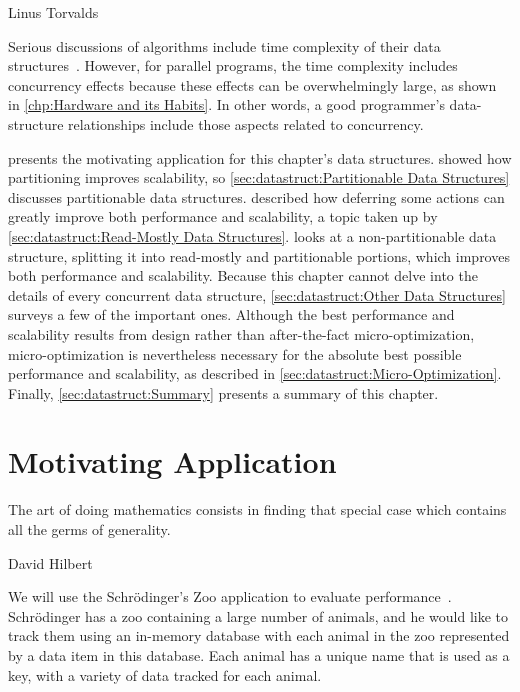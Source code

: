 
%
	 {Linus Torvalds}

Serious discussions of algorithms include time complexity of their
data structures~\cite{ThomasHCorman2001Algorithms}.
However, for parallel programs, the time complexity includes concurrency
effects because these effects can be overwhelmingly large, as shown in
\cref{chp:Hardware and its Habits}.
In other words, a good programmer's data-structure relationships
include those aspects related to concurrency.

presents the motivating application for this chapter's data structures.
 showed how
partitioning improves scalability, so
\cref{sec:datastruct:Partitionable Data Structures}
discusses partitionable data structures.
 described how deferring some
actions can greatly improve both performance and scalability,
a topic taken up by
\cref{sec:datastruct:Read-Mostly Data Structures}.
looks at a non-partitionable data structure, splitting
it into read-mostly and partitionable portions,
which improves both performance and scalability.
Because this chapter cannot delve into the details of every concurrent
data structure,
\cref{sec:datastruct:Other Data Structures}
surveys a few of the important ones.
Although the best performance and scalability results from design rather
than after-the-fact micro-optimization, micro-optimization is nevertheless
necessary for the absolute best possible performance and scalability,
as described in
\cref{sec:datastruct:Micro-Optimization}.
Finally, \cref{sec:datastruct:Summary}
presents a summary of this chapter.

\section{Motivating Application}
\label{sec:datastruct:Motivating Application}
%
\epigraph{The art of doing mathematics consists in finding that special
	  case which contains all the germs of generality.}
	 {David Hilbert}

We will use the Schr\"odinger's Zoo application to evaluate
performance~\cite{McKenney:2013:SDS:2483852.2483867}.
Schr\"odinger has a zoo containing a large number of animals, and
he would like to track them using an in-memory database with
each animal in the zoo represented by a data item in this database.
Each animal has a unique name that is used as a key, with a variety
of data tracked for each animal.

